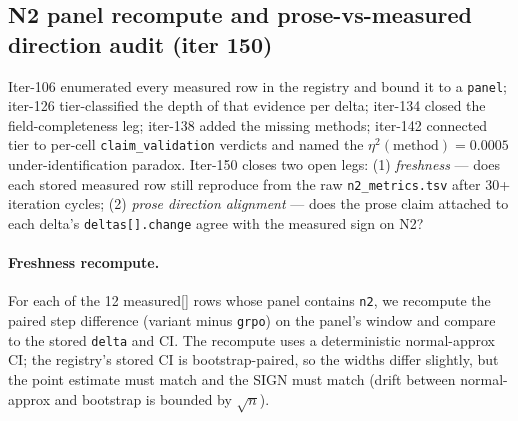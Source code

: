 %
%

\subsection{N2 panel recompute and prose-vs-measured direction audit (iter 150)}
\label{sec:p6-iter150-recompute-prose}

Iter-106 enumerated every measured row in the registry and bound it to a
\texttt{panel}; iter-126 tier-classified the depth of that evidence per
delta; iter-134 closed the field-completeness leg; iter-138 added the
missing methods; iter-142 connected tier to per-cell
\texttt{claim\_validation} verdicts and named the $\eta^2(\text{method})
= 0.0005$ under-identification paradox. Iter-150 closes two open legs:
(1) \emph{freshness} --- does each stored measured row still reproduce
from the raw \texttt{n2\_metrics.tsv} after 30+ iteration cycles; (2)
\emph{prose direction alignment} --- does the prose claim attached to
each delta's \texttt{deltas[].change} agree with the measured sign on
N2?

\paragraph{Freshness recompute.}
For each of the 12 measured[] rows whose panel contains \texttt{n2}, we
recompute the paired step difference (variant minus \texttt{grpo}) on
the panel's window and compare to the stored \texttt{delta} and CI.
The recompute uses a deterministic normal-approx CI; the registry's
stored CI is bootstrap-paired, so the widths differ slightly, but the
point estimate must match and the SIGN must match (drift between
normal-approx and bootstrap is bounded by $\sqrt{n}$).

